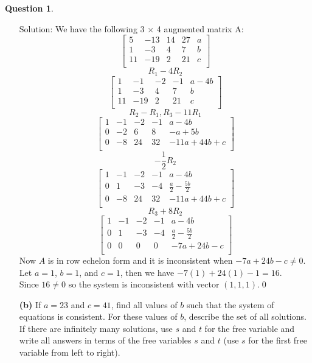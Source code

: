 \documentclass{article}
\theoremstyle{definition}
\newtheorem{question}{Question}
\begin{document}
\begin{question}
\begin{enumerate}
Solution: We have the following 3 \(\times\) 4 augmented matrix A:
\[\left[
\begin{array}{cccc|c}
    5 & -13 & 14 & 27 & a \\
    1 & -3 & 4 & 7 & b \\
    11 & -19 & 2 & 21 & c \\
\end{array}
\right]\]
\[R_1 - 4R_2\]
\[\left[
\begin{array}{cccc|c}
    1 & -1 & -2 & -1 & a-4b \\
    1 & -3 & 4 & 7 & b \\
    11 & -19 & 2 & 21 & c \\
\end{array}
\right]\]
\[R_2-R_1, R_3-11R_1\]
\[\left[
\begin{array}{cccc|c}
    1 & -1 & -2 & -1 & a-4b \\
    0 & -2 & 6 & 8 & -a+5b \\
    0 & -8 & 24 & 32 & -11a+44b+c \\
\end{array}
\right]\]
\[-\frac{1}{2}R_2\]
\[\left[
\begin{array}{cccc|c}
    1 & -1 & -2 & -1 & a-4b \\
    0 & 1 & -3 & -4 & \frac{a}{2} - \frac{5b}{2} \\
    0 & -8 & 24 & 32 & -11a+44b+c \\
\end{array}
\right]\]
\[R_3+8R_2\]
\[\left[
\begin{array}{cccc|c}
    1 & -1 & -2 & -1 & a-4b \\
    0 & 1 & -3 & -4 & \frac{a}{2} - \frac{5b}{2} \\
    0 & 0 & 0 & 0 & -7a+24b-c \\
\end{array}
\right]\]
Now \(A\) is in row echelon form and it is inconsistent when \(-7a+24b-c\neq0\). \\
Let \(a=1\), \(b=1\), and \(c=1\), then we have \(-7(1)+24(1)-1=16\). \\ Since \(16\neq0\) so the system is inconsistent with vector \((1,1,1)\).\qed

\vspace{.25cm}

\item[{\bf (b)}] If $a = 23$ and $c = 41$, find all values of $b$ such that the system of equations is consistent. For these values of $b$, describe the set of all solutions.  If there are infinitely many solutions, use $s$ and $t$ for the free variable and write all answers in terms of the free variables $s$ and $t$ (use $s$ for the first free variable from left to right).


\end{enumerate}
\end{question}
\end{document}

